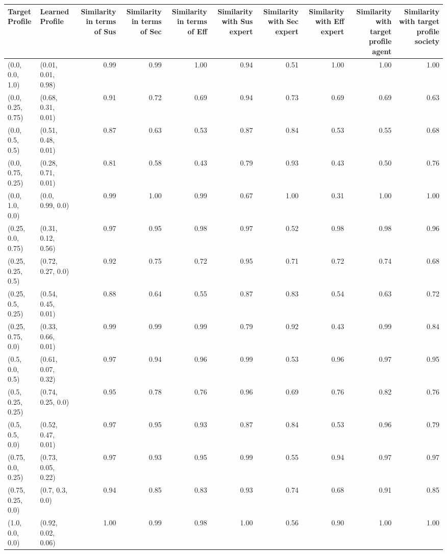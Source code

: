 \begin{tabular}{llrrrrrrrr}
\toprule
Target Profile & Learned Profile & Similarity in terms of Sus & Similarity in terms of Sec & Similarity in terms of Eff & Similarity with Sus expert & Similarity with Sec expert & Similarity with Eff expert & Similarity with target profile agent & Similarity with target profile society \\
\midrule
(0.0, 0.0, 1.0) & (0.01, 0.01, 0.98) & 0.99 & 0.99 & 1.00 & 0.94 & 0.51 & 1.00 & 1.00 & 1.00 \\
(0.0, 0.25, 0.75) & (0.68, 0.31, 0.01) & 0.91 & 0.72 & 0.69 & 0.94 & 0.73 & 0.69 & 0.69 & 0.63 \\
(0.0, 0.5, 0.5) & (0.51, 0.48, 0.01) & 0.87 & 0.63 & 0.53 & 0.87 & 0.84 & 0.53 & 0.55 & 0.68 \\
(0.0, 0.75, 0.25) & (0.28, 0.71, 0.01) & 0.81 & 0.58 & 0.43 & 0.79 & 0.93 & 0.43 & 0.50 & 0.76 \\
(0.0, 1.0, 0.0) & (0.0, 0.99, 0.0) & 0.99 & 1.00 & 0.99 & 0.67 & 1.00 & 0.31 & 1.00 & 1.00 \\
(0.25, 0.0, 0.75) & (0.31, 0.12, 0.56) & 0.97 & 0.95 & 0.98 & 0.97 & 0.52 & 0.98 & 0.98 & 0.96 \\
(0.25, 0.25, 0.5) & (0.72, 0.27, 0.0) & 0.92 & 0.75 & 0.72 & 0.95 & 0.71 & 0.72 & 0.74 & 0.68 \\
(0.25, 0.5, 0.25) & (0.54, 0.45, 0.01) & 0.88 & 0.64 & 0.55 & 0.87 & 0.83 & 0.54 & 0.63 & 0.72 \\
(0.25, 0.75, 0.0) & (0.33, 0.66, 0.01) & 0.99 & 0.99 & 0.99 & 0.79 & 0.92 & 0.43 & 0.99 & 0.84 \\
(0.5, 0.0, 0.5) & (0.61, 0.07, 0.32) & 0.97 & 0.94 & 0.96 & 0.99 & 0.53 & 0.96 & 0.97 & 0.95 \\
(0.5, 0.25, 0.25) & (0.74, 0.25, 0.0) & 0.95 & 0.78 & 0.76 & 0.96 & 0.69 & 0.76 & 0.82 & 0.76 \\
(0.5, 0.5, 0.0) & (0.52, 0.47, 0.01) & 0.97 & 0.95 & 0.93 & 0.87 & 0.84 & 0.53 & 0.96 & 0.79 \\
(0.75, 0.0, 0.25) & (0.73, 0.05, 0.22) & 0.97 & 0.93 & 0.95 & 0.99 & 0.55 & 0.94 & 0.97 & 0.97 \\
(0.75, 0.25, 0.0) & (0.7, 0.3, 0.0) & 0.94 & 0.85 & 0.83 & 0.93 & 0.74 & 0.68 & 0.91 & 0.85 \\
(1.0, 0.0, 0.0) & (0.92, 0.02, 0.06) & 1.00 & 0.99 & 0.98 & 1.00 & 0.56 & 0.90 & 1.00 & 1.00 \\
\bottomrule
\end{tabular}
